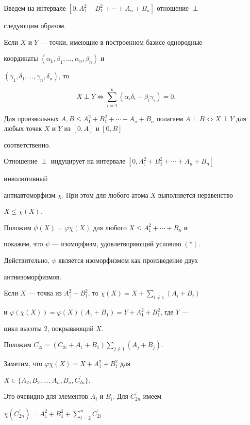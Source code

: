 \begin{pf}
Введем на интервале $[0,A_1^2+B_1^2+\dotsb+A_n+B_n]$ отношение $\perp$


следующим образом.


Если $X$ и $Y$ --- точки, имеющие в построенном базисе однородные


координаты $(\alpha_1,\beta_1,\dotsc,\alpha_n,\beta_n)$ и


$(\gamma_1,\delta_1,\dotsc,\gamma_n,\delta_n)$, то


$$


X \perp Y \Leftrightarrow \sum_{i=1}^n (\alpha_i \delta_i-\beta_i \gamma_i)=0.


$$


Для произвольных $A,B \leq A_1^2+B_1^2+\dotsb+A_n+B_n$ полагаем $A \perp B


\Leftrightarrow X \perp Y$ для любых точек $X$ и $Y$ из $[0,A]$ и $[0,B]$


соответственно.


Отношение $\perp$ индуцирует на интервале $[0,A_1^2+B_1^2+\dotsb+A_n+B_n]$


инволютивный


антиавтоморфизм $\chi$. При этом для любого атома $X$ выполняется неравенство


$X \leq \chi(X)$.





Положим $\psi(X)=\varphi \chi(X)$ для любого $X \leq A_1^2+\dotsb+B_n$ и


покажем, что $\psi$ --- изоморфизм, удовлетворяющий условию $(\ast)$.


Действительно, $\psi$ является изоморфизмом как произведение двух


антиизоморфизмов.


Если $X$ --- точка из $A_1^2+B_1^2$, то $\chi(X)=X+


\sum\limits_{i \ne 1}(A_i+B_i)$


и $\varphi(\chi(X))=\varphi(X)(A_1+B_1)=Y+A_1^2+B_1^2$, где $Y$ ---


цикл высоты 2, покрывающий $X$.


Положим $C_{2i}^{\prime}=(C_{2i}+A_1+B_1)\sum\limits_{j \ne 1}(A_j+B_j).$


Заметим, что $\varphi \chi(X) =X+A_1^2+B_1^2$ для


$X \in \{A_2,B_2,\dotsc,A_n,B_n,C_{2n}^{\prime}\}$.


Это очевидно для элементов $A_i$ и $B_i$. Для $C_{2n}^{\prime}$ имеем


$\chi(C_{2n}^{\prime})=A_1^2+B_1^2+\sum\limits_{i=2}^n C_{2i}^{\prime}$



\end{pf}

